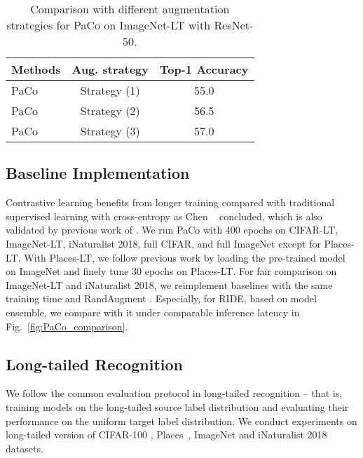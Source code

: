 \documentclass[10pt,twocolumn,letterpaper]{article}
\begin{document}
\begin{table}[t]
	\centering
	\caption{Comparison with different augmentation strategies for PaCo on ImageNet-LT with ResNet-50.}
	\label{tab:ablation_strongaug}
	{
		\begin{tabular}{lcc}
			\toprule
			Methods  &Aug. strategy &Top-1 Accuracy \\
			\midrule
			PaCo     &Strategy (1)   &55.0 \\
			PaCo     &Strategy (2)  &56.5 \\
			PaCo     &Strategy (3) &57.0 \\
			\bottomrule
		\end{tabular}
	}
\end{table}

\subsection{Baseline Implementation}
\label{Sec:baseline_implementation}
Contrastive learning benefits from longer training compared with traditional supervised learning with cross-entropy as Chen \etal~\cite{DBLP:conf/icml/ChenK0H20} concluded, which is also validated by previous work of \cite{DBLP:conf/icml/ChenK0H20, DBLP:conf/cvpr/He0WXG20, DBLP:journals/corr/abs-2003-04297, DBLP:conf/nips/GrillSATRBDPGAP20, DBLP:conf/nips/CaronMMGBJ20}. We run PaCo with 400 epochs on CIFAR-LT, ImageNet-LT, iNaturalist 2018, full CIFAR, and full ImageNet except for Places-LT. With Places-LT, we follow previous work \cite{Liu_2019_CVPR, DBLP:journals/corr/abs-2101-10633} by loading the pre-trained model on ImageNet and finely tune 30 epochs on Places-LT.
For fair comparison on ImageNet-LT and iNaturalist 2018, we reimplement baselines with the same training time and RandAugment \cite{DBLP:conf/nips/CubukZS020}. Especially, for RIDE, based on model ensemble, we compare with it under comparable inference latency in Fig.~\ref{fig:PaCo_comparison}.

\subsection{Long-tailed Recognition}
We follow the common evaluation protocol \cite{Liu_2019_CVPR, DBLP:journals/corr/abs-2101-10633,DBLP:conf/iclr/KangXRYGFK20} in long-tailed recognition -- that is, training models on the long-tailed source label distribution and evaluating their performance on the uniform target label distribution.
We conduct experiments on long-tailed version of CIFAR-100 \cite{cb-focal, DBLP:conf/nips/CaoWGAM19}, Places~\cite{Liu_2019_CVPR}, ImageNet \cite{Liu_2019_CVPR} and iNaturalist 2018 \cite{van2018inaturalist} datasets.
\end{document}

